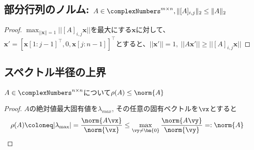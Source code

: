        \subsection{部分行列のノルム: \texorpdfstring{$A\in\complexNumbers^{m\times n}, \|[A]_{i,j}\|_2 \leq \|A\|_2$}{A∈C\string^(n×n), ||A\_(i,j)||\_2 ≦ ||A||\_2}}
            \begin{proof}
                \quad\par
                $\max_{||\bm{x}||=1}||[A]_{i,j}\bm{x}||$を最大にする$\bm{x}$に対して、$\bm{x}' = [\bm{x}[1:j-1]^\top,0,\bm{x}[j:n-1]]^\top$とすると、$||\bm{x}'|| = 1,\;||A\bm{x}'|| \geq ||[A]_{i,j}\bm{x}||$
            \end{proof}
        \subsection{スペクトル半径の上界}
            \begin{shadebox}
                $A\in\complexNumbers^{n\times n}$について$\rho(A)\leq\norm{A}$
            \end{shadebox}
            \begin{proof}
                \quad\par
                $A$の絶対値最大固有値を$\lambda_{max}$, その任意の固有ベクトルを$\vx$とすると
                \[\rho(A) \coloneq |\lambda_\mathrm{max}| = \frac{\norm{A\vx}}{\norm{\vx}} \leq \max_{\vy\neq\bm{0}}\frac{\norm{A\vy}}{\norm{\vy}} =: \norm{A}\]
            \end{proof}
